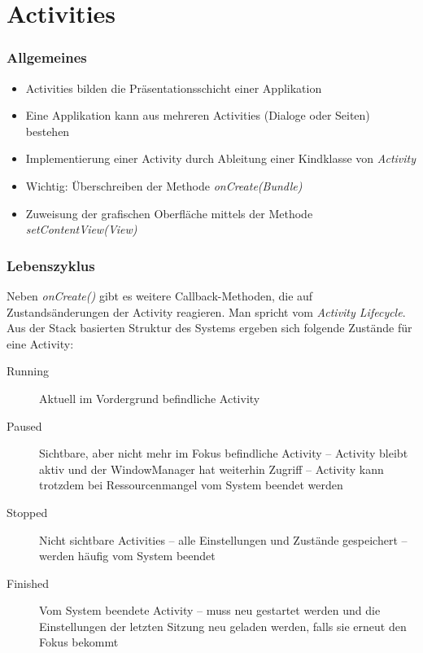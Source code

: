 \section{Activities}
\begin{frame}[label=activities]
   \frametitle{Allgemeines}
   \begin{itemize}
      \item Activities bilden die Präsentationsschicht einer Applikation
      \item Eine Applikation kann aus mehreren Activities (Dialoge oder Seiten) bestehen
      \item Implementierung einer Activity durch Ableitung einer Kindklasse von \emph{Activity}
      \item Wichtig: Überschreiben der Methode \emph{onCreate(Bundle)}
      \item Zuweisung der grafischen Oberfläche mittels der Methode \emph{setContentView(View)}
   \end{itemize}

   
\end{frame}

\begin{frame}[label=activities_states]
   \frametitle{Lebenszyklus}
   Neben \emph{onCreate()} gibt es weitere Callback-Methoden, die auf 
   Zustandsänderungen der Activity reagieren. Man spricht vom \emph{Activity Lifecycle}.\\

   Aus der Stack basierten Struktur des Systems ergeben sich folgende Zustände 
   für eine Activity:

   \begin{description}
      \item[Running] Aktuell im Vordergrund befindliche Activity
      \item[Paused] Sichtbare, aber nicht mehr im Fokus befindliche Activity --
         Activity bleibt aktiv und der WindowManager hat weiterhin Zugriff -- 
         Activity kann trotzdem bei Ressourcenmangel vom System beendet werden
      \item[Stopped] Nicht sichtbare Activities -- alle Einstellungen und 
         Zustände gespeichert -- werden häufig vom System beendet
      \item[Finished] Vom System beendete Activity -- muss neu gestartet 
         werden und die Einstellungen der letzten Sitzung neu geladen werden, 
         falls sie erneut den Fokus bekommt
   \end{description}
\end{frame}

